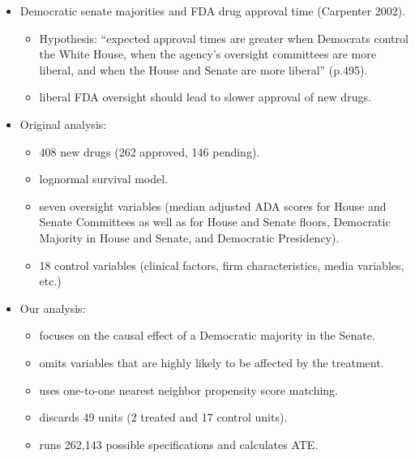 \documentclass[20pt,landscape,pdftex]{foils}
\begin{document}


\hypersetup{pdfpagetransition=Replace}

\begin{itemize}
\item Democratic senate majorities and FDA drug approval time
  (Carpenter 2002).\pause
  \begin{itemize}
  \item Hypothesis: ``expected approval times are greater when
    Democrats control the White House, when the agency's oversight
    committees are more liberal, and when the House and Senate are
    more liberal'' (p.495).\pause
  \item liberal FDA oversight should lead to slower approval of new
    drugs.\pause 
  \end{itemize}

\item Original analysis:\pause
  \begin{itemize}
  \item 408 new drugs (262 approved, 146 pending).\pause
  \item lognormal survival model.\pause
  \item seven oversight variables (median adjusted ADA scores for
    House and Senate Committees as well as for House and Senate
    floors, Democratic Majority in House and Senate, and Democratic
    Presidency).\pause
  \item 18 control variables (clinical factors, firm characteristics,
    media variables, etc.)\pause
  \end{itemize}

\item Our analysis:\pause
  \begin{itemize}
  \item focuses on the causal effect of a Democratic majority in the
    Senate.\pause
  \item omits variables that are highly likely to be affected by the
    treatment.\pause
  \item uses one-to-one nearest neighbor propensity score matching.\pause
  \item discards 49 units (2 treated and 17 control units).\pause
  \item runs 262,143 possible specifications and calculates ATE.\pause
  \end{itemize}
\end{itemize}
\end{document}
